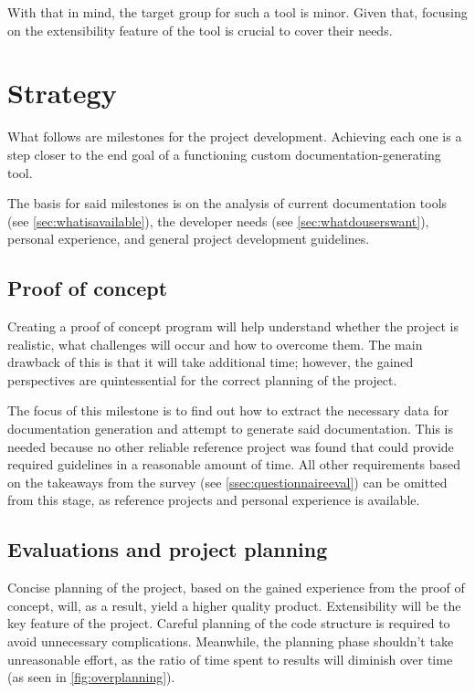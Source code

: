 With that in mind, the target group for such a tool is minor. Given that, focusing on the extensibility feature of the tool is crucial to cover their needs.

\section*{Strategy}

What follows are milestones for the project development.
Achieving each one is a step closer to the end goal of a functioning custom documentation-generating tool.

The basis for said milestones is on the analysis of current documentation tools (see \ref{sec:whatisavailable}), the developer needs (see \ref{sec:whatdouserswant}), personal experience, and general project development guidelines.

\subsection*{Proof of concept} \label{subSecProofOfConcept}

Creating a proof of concept program will help understand whether the project is realistic, what challenges will occur and how to overcome them.
The main drawback of this is that it will take additional time; however, the gained perspectives are quintessential for the correct planning of the project.

The focus of this milestone is to find out how to extract the necessary data for documentation generation and attempt to generate said documentation.
This is needed because no other reliable reference project was found that could provide required guidelines in a reasonable amount of time.
All other requirements based on the takeaways from the survey (see \ref{ssec:questionnaireeval}) can be omitted from this stage, as reference projects and personal experience is available.

\subsection*{Evaluations and project planning} \label{subSecEvalProjPlanning}

Concise planning of the project, based on the gained experience from the proof of concept, will, as a result, yield a higher quality product.
Extensibility will be the key feature of the project. Careful planning of the code structure is required to avoid unnecessary complications.
Meanwhile, the planning phase shouldn't take unreasonable effort, as the ratio of time spent to results will diminish over time (as seen in \ref{fig:overplanning}). \cite{ruparelia_stop_2016}

